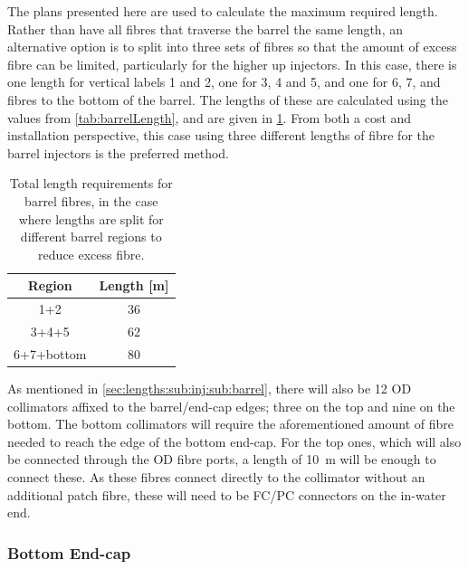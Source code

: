 \documentclass[a4paper,11pt]{article}
\begin{document}
The plans presented here are used to calculate the maximum required length. Rather than have all fibres that traverse the barrel the same length, an alternative option is to split into three sets of fibres so that the amount of excess fibre can be limited, particularly for the higher up injectors. In this case, there is one length for vertical labels 1 and 2, one for 3, 4 and 5, and one for 6, 7, and fibres to the bottom of the barrel. The lengths of these are calculated using the values from \cref{tab:barrelLength}, and are given in \cref{tab:barrelLengthSplit}. From both a cost and installation perspective, this case using three different lengths of fibre for the barrel injectors is the preferred method.
\begin{table}[h!]
\centering
\begin{tabular}{cc}\toprule
Region		&		Length [m]		\\ \midrule
1+2			&		36	\\
3+4+5		&		62	\\
6+7+bottom	&		80	\\ \bottomrule
\end{tabular}
\caption{Total length requirements for barrel fibres, in the case where lengths are split for different barrel regions to reduce excess fibre.}\label{tab:barrelLengthSplit}
\end{table}

As mentioned in \cref{sec:lengths:sub:inj:sub:barrel}, there will also be 12 OD collimators affixed to the barrel/end-cap edges; three on the top and nine on the bottom. The bottom collimators will require the aforementioned amount of fibre needed to reach the edge of the bottom end-cap. For the top ones, which will also be connected through the OD fibre ports, a length of 10~m will be enough to connect these. As these fibres connect directly to the collimator without an additional patch fibre, these will need to be FC/PC connectors on the in-water end.

\subsubsection{Bottom End-cap}\label{sec:lengths:sub:len:sub:bottom}
\end{document}
